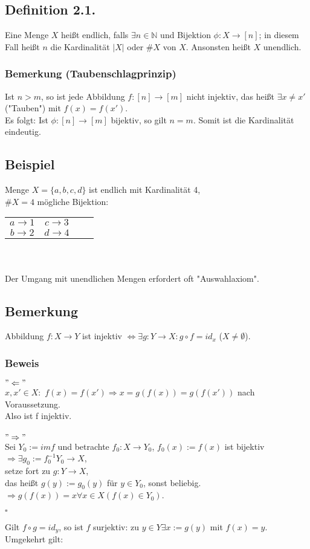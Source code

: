 \documentclass[a4paper,twoside]{article}
\begin{document}
\subsection*{Definition 2.1.}
Eine Menge $X$ heißt endlich, falls $\exists n \in \mathbb{N}$ und Bijektion $\phi: X \rightarrow [n]$; in diesem Fall heißt $n$ die Kardinalität $|X|$ oder $\#X$ von $X$.
Ansonsten heißt $X$ unendlich. 
\subsubsection*{Bemerkung (Taubenschlagprinzip)}
Ist $n>m$, so ist jede Abbildung $f: [n] \rightarrow [m]$ nicht injektiv, das heißt $\exists x\neq x'$ ("Tauben") mit $f(x) = f(x')$. \\
Es folgt: Ist $\phi : [n] \rightarrow [m]$ bijektiv, so gilt $n=m$. Somit ist die Kardinalität eindeutig.

\subsection*{Beispiel}
Menge $X = \{a,b,c,d\}$ ist endlich mit Kardinalität 4, \\
$\#X =  4$ mögliche Bijektion: 
\begin{tabular}{cccc}
$a \rightarrow 1$ & $c \rightarrow 3$ \\
$b \rightarrow 2$ & $d \rightarrow 4$ \\
\end{tabular}
\\
\\
Der Umgang mit unendlichen Mengen erfordert oft "Auswahlaxiom".

\subsection*{Bemerkung}
Abbildung $f: X \rightarrow Y$ ist injektiv $\Leftrightarrow \exists g: Y \rightarrow X : g \circ f = id_x$ ($X \neq \emptyset $).
\subsubsection*{Beweis}
$"\Leftarrow"$ \\
$x,x' \in X :$
$f(x) = f(x') \Rightarrow  x = g(f(x)) = g(f(x'))$ nach Voraussetzung.\\
Also ist f injektiv. \\ 
\\
$"\Rightarrow"$\\
Sei $Y_0 := im f$ und betrachte $f_0 : X \rightarrow Y_0$, $f_0(x) := f(x)$ ist bijektiv \\
 $\Rightarrow \exists g_0 := f_0^{-1} Y_0 \rightarrow X$,\\
setze fort zu $g: Y \rightarrow X$,\\
das heißt $g(y) := g_0(y)$ für $y\in Y_0$, sonst beliebig.\\
$\Rightarrow g(f(x)) = x \forall  x \in X (f(x) \in Y_0)$.\\
\begin{flushright}
$\square$\\
\end{flushright}
Gilt $f \circ g = id_y$, so ist $f$ surjektiv: zu $y\in Y \exists x:= g(y)$ mit $f(x) = y$.\\
Umgekehrt gilt:
\end{document}
